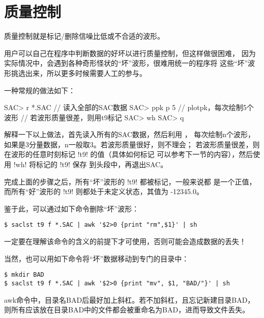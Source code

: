 \section{质量控制}

质量控制就是标记/删除信噪比低或不合适的波形。

用户可以自己在程序中判断数据的好坏以进行质量控制，但这样做很困难，
因为实际情况中，会遇到各种奇形怪状的``坏''波形，很难用统一的程序将
这些``坏''波形挑选出来，所以更多时候需要人工的参与。

一种常规的做法如下：
\begin{SACCode}
SAC> r *.SAC        // 读入全部的SAC数据
SAC> ppk p 5        // plotpk，每次绘制5个波形
// 若波形质量很差，则用t9标记
SAC> wh
SAC> q
\end{SACCode}

解释一下以上做法，首先读入所有的SAC数据，然后利用 ，
每次绘制n个波形，如果是3分量数据，n一般取3。若波形质量很好，则不理会；
若波形质量很差，则在波形的任意时刻标记 !t9! 的值（具体如何标记
可以参考下一节的内容），然后使用 !wh! 将标记的 !t9! 保存
到头段中，再退出SAC。

完成上面的步骤之后，所有``坏''波形的 !t9! 都被标记，一般来说都
是一个正值，而所有``好''波形的 !t9! 则都处于未定义状态，其值为
-12345.0。

鉴于此，可以通过如下命令删除``坏''波形：
\begin{verbatim}
$ saclst t9 f *.SAC | awk '$2>0 {print "rm",$1}' | sh
\end{verbatim}
\begin{note}
一定要在理解该命令的含义的前提下才可使用，否则可能会造成数据的丢失！
\end{note}

当然，也可以用如下命令将``坏''数据移动到专门的目录中：
\begin{verbatim}
$ mkdir BAD
$ saclst t9 f *.SAC | awk '$2>0 {print "mv", $1, "BAD/"}' | sh
\end{verbatim}
\begin{note}
awk命令中，目录名BAD后最好加上斜杠。若不加斜杠，且忘记新建目录BAD，
则所有应该放在目录BAD中的文件都会被重命名为BAD，进而导致文件丢失。
\end{note}
